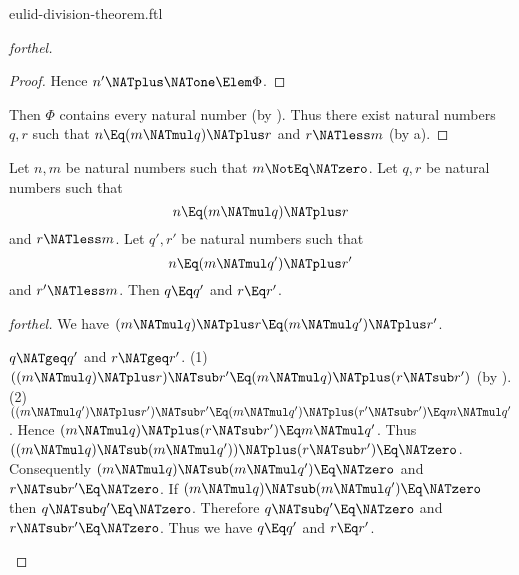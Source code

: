 \documentclass{stex}
\begin{document}
\begin{smodule}{eulid-division-theorem.ftl}
\begin{proof}[forthel]
\begin{proof}
    Hence $n' \NATplus \NATone \Elem \Phi$.
  \end{proof}

  Then $\Phi$ contains every natural number (by ).
  Thus there exist natural numbers $q, r$ such that $n \Eq (m \NATmul q) \NATplus r$ and $r \NATless m$ (by a).
\end{proof}

\begin{theorem}[forthel,title=Euclid's Division Theorem: Uniqueness,id=euclid_uniqueness]
  Let $n, m$ be natural numbers such that $m \NotEq \NATzero$.
  Let $q, r$ be natural numbers such that
  \[n \Eq (m \NATmul q) \NATplus r\]
  and $r \NATless m$.
  Let $q', r'$ be natural numbers such that
  \[n \Eq (m \NATmul q') \NATplus r'\]
  and $r' \NATless m$.
  Then $q \Eq q'$ and $r \Eq r'$.
\end{theorem}
\begin{proof}[forthel]
  We have $(m \NATmul q) \NATplus r \Eq (m \NATmul q') \NATplus r'$.

  \begin{case}{$q \NATgeq q'$ and $r \NATgeq r'$.}
    (1) $((m \NATmul q) \NATplus r) \NATsub r' \Eq (m \NATmul q) \NATplus (r \NATsub r')$ (by ).
    (2) $((m \NATmul q') \NATplus r') \NATsub r'
      \Eq (m \NATmul q') \NATplus (r' \NATsub r')
      \Eq m \NATmul q'$.
    Hence $(m \NATmul q) \NATplus (r \NATsub r') \Eq m \NATmul q'$.
    Thus $((m \NATmul q) \NATsub (m \NATmul q')) \NATplus (r \NATsub r') \Eq \NATzero$.
    Consequently $(m \NATmul q) \NATsub (m \NATmul q') \Eq \NATzero$ and $r \NATsub r' \Eq \NATzero$.
    If $(m \NATmul q) \NATsub (m \NATmul q') \Eq \NATzero$ then $q \NATsub q' \Eq \NATzero$.
    Therefore $q \NATsub q' \Eq \NATzero$ and $r \NATsub r' \Eq \NATzero$.
    Thus we have $q \Eq q'$ and $r \Eq r'$.
  \end{case}


\end{proof}
\end{smodule}
\end{document}
